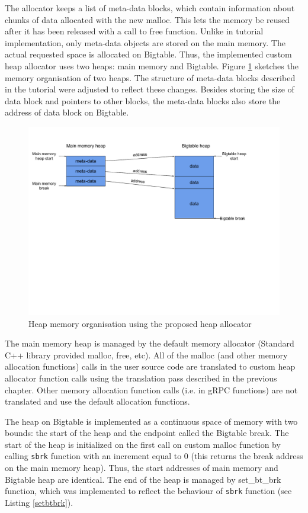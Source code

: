 \documentclass[bsc,frontabs,twoside,singlespacing,parskip,deptreport]{infthesis}     %
\begin{document}
The allocator keeps a list of meta-data blocks, which contain information about chunks of data allocated with the new malloc. This lets the memory be reused after it has been released with a call to free function. Unlike in tutorial implementation, only meta-data objects are stored on the main memory. The actual requested space is allocated on Bigtable. Thus, the implemented custom heap allocator uses two heaps: main memory and Bigtable. Figure \ref{fig:heap_organisation} sketches the memory organisation of two heaps. The structure of meta-data blocks described in the tutorial were adjusted to reflect these changes. Besides storing the size of data block and pointers to other blocks, the meta-data blocks also store the address of data block on Bigtable.

\begin{figure}[H]
\centering
\includegraphics[width=1\textwidth]{images/heap_organisation}
\caption{Heap memory organisation using the proposed heap allocator}
\label{fig:heap_organisation}
\end{figure}

The main memory heap is managed by the default memory allocator (Standard C++ library provided malloc, free, etc). All of the malloc (and other memory allocation functions) calls in the user source code are translated to custom heap allocator function calls using the translation pass described in the previous chapter. Other memory allocation function calls (i.e. in gRPC functions) are not translated and use the default allocation functions.

The heap on Bigtable is implemented as a continuous space of memory with two bounds: the start of the heap and the endpoint  called the Bigtable break. The start of the heap is initialized on the first call on custom malloc function by calling \texttt{sbrk} function with an increment equal to 0 (this returns the break address on the main memory heap). Thus, the start addresses of main memory and Bigtable heap are identical. The end of the heap is managed by set\_bt\_brk function, which was implemented to reflect the behaviour of \texttt{sbrk} function (see Listing \ref{setbtbrk}).
\end{document}
